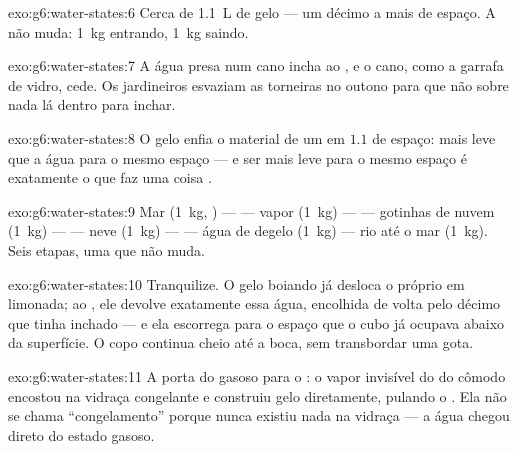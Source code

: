 \begin{solution}{exo:g6:water-states:6}
Cerca de \qty{1.1}{L} de gelo --- um décimo a mais de espaço. A 
não muda: \qty{1}{kg} entrando, \qty{1}{kg} saindo.
\end{solution}

\begin{solution}{exo:g6:water-states:7}
A água presa num cano incha ao , e o cano, como a garrafa de
vidro, cede. Os jardineiros esvaziam as torneiras no outono para que
não sobre nada lá dentro para inchar.
\end{solution}

\begin{solution}{exo:g6:water-states:8}
O gelo enfia o material de um  em $1.1$  de espaço: mais
leve que a água para o mesmo espaço --- e ser mais leve para o mesmo
espaço é exatamente o que faz uma coisa .
\end{solution}

\begin{solution}{exo:g6:water-states:9}
Mar (\qty{1}{kg}, ) ---  --- vapor (\qty{1}{kg})
---  --- gotinhas de nuvem (\qty{1}{kg}) ---
 --- neve (\qty{1}{kg}) ---  --- água de degelo
(\qty{1}{kg}) --- rio até o mar (\qty{1}{kg}). Seis etapas, uma 
que não muda.
\end{solution}

\begin{solution}{exo:g6:water-states:10}
Tranquilize. O gelo boiando já desloca o próprio \emph{} em
limonada; ao , ele devolve exatamente essa água, encolhida de
volta pelo décimo que tinha inchado --- e ela escorrega para o espaço
que o cubo já ocupava abaixo da superfície. O copo continua cheio até
a boca, sem transbordar uma gota.
\end{solution}

\begin{solution}{exo:g6:water-states:11}
A porta do gasoso para o : o vapor invisível do  do cômodo
encostou na vidraça congelante e construiu gelo diretamente, pulando
o . Ela não se chama ``congelamento'' porque nunca existiu
nada  na vidraça --- a água chegou direto do estado gasoso.
\end{solution}

